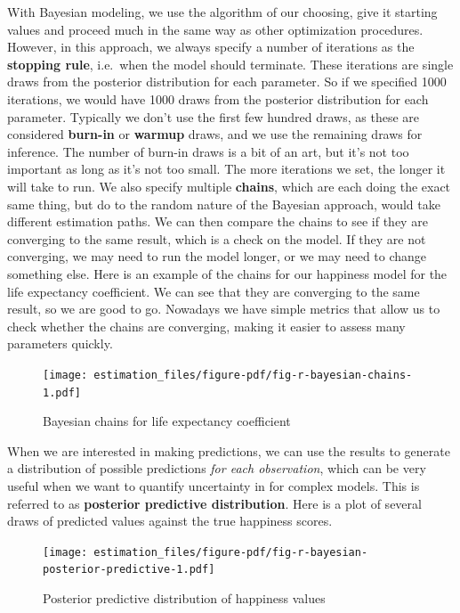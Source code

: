 \documentclass[
  letterpaper,
]{krantz}
\begin{document}
With Bayesian modeling, we use the algorithm of our choosing, give it
starting values and proceed much in the same way as other optimization
procedures. However, in this approach, we always specify a number of
iterations as the \textbf{stopping rule}, i.e.~when the model should
terminate. These iterations are single draws from the posterior
distribution for each parameter. So if we specified 1000 iterations, we
would have 1000 draws from the posterior distribution for each
parameter. Typically we don't use the first few hundred draws, as these
are considered \textbf{burn-in} or \textbf{warmup} draws, and we use the
remaining draws for inference. The number of burn-in draws is a bit of
an art, but it's not too important as long as it's not too small. The
more iterations we set, the longer it will take to run. We also specify
multiple \textbf{chains}, which are each doing the exact same thing, but
do to the random nature of the Bayesian approach, would take different
estimation paths. We can then compare the chains to see if they are
converging to the same result, which is a check on the model. If they
are not converging, we may need to run the model longer, or we may need
to change something else. Here is an example of the chains for our
happiness model for the life expectancy coefficient. We can see that
they are converging to the same result, so we are good to go. Nowadays
we have simple metrics that allow us to check whether the chains are
converging, making it easier to assess many parameters quickly.

\begin{figure}

{\centering \texttt{[image: estimation\_files/figure-pdf/fig-r-bayesian-chains-1.pdf]}

}

\caption{\label{fig-r-bayesian-chains}Bayesian chains for life
expectancy coefficient}

\end{figure}

When we are interested in making predictions, we can use the results to
generate a distribution of possible predictions \emph{for each
observation}, which can be very useful when we want to quantify
uncertainty in for complex models. This is referred to as
\textbf{posterior predictive distribution}. Here is a plot of several
draws of predicted values against the true happiness scores.

\begin{figure}

{\centering \texttt{[image: estimation\_files/figure-pdf/fig-r-bayesian-posterior-predictive-1.pdf]}

}

\caption{\label{fig-r-bayesian-posterior-predictive}Posterior predictive
distribution of happiness values}

\end{figure}
\end{document}
